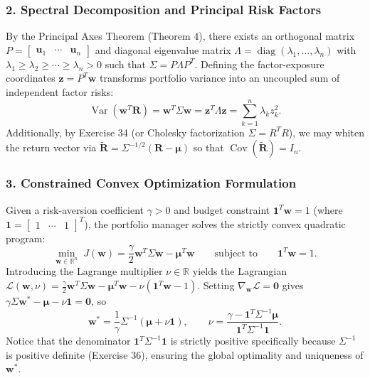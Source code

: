 \documentclass[11pt, letterpaper]{article}
\theoremstyle{definition}
\theoremstyle{remark}
\begin{document}
\subsubsection*{2. Spectral Decomposition and Principal Risk Factors}
By the Principal Axes Theorem (Theorem 4), there exists an orthogonal matrix $P = \begin{bmatrix} \mathbf{u}_1 & \cdots & \mathbf{u}_n \end{bmatrix}$ and diagonal eigenvalue matrix $\Lambda = \operatorname{diag}(\lambda_1, \dots, \lambda_n)$ with $\lambda_1 \ge \lambda_2 \ge \cdots \ge \lambda_n > 0$ such that $\Sigma = P \Lambda P^T$. Defining the factor-exposure coordinates $\mathbf{z} = P^T \mathbf{w}$ transforms portfolio variance into an uncoupled sum of independent factor risks:
\[
\operatorname{Var}(\mathbf{w}^T \mathbf{R}) = \mathbf{w}^T \Sigma \mathbf{w} = \mathbf{z}^T \Lambda \mathbf{z} = \sum_{k=1}^n \lambda_k z_k^2.
\]
Additionally, by Exercise 34 (or Cholesky factorization $\Sigma = R^T R$), we may whiten the return vector via $\widetilde{\mathbf{R}} = \Sigma^{-1/2}(\mathbf{R} - \boldsymbol{\mu})$ so that $\operatorname{Cov}(\widetilde{\mathbf{R}}) = I_n$.

\subsubsection*{3. Constrained Convex Optimization Formulation}
Given a risk-aversion coefficient $\gamma > 0$ and budget constraint $\mathbf{1}^T \mathbf{w} = 1$ (where $\mathbf{1} = \begin{bmatrix} 1 & \cdots & 1 \end{bmatrix}^T$), the portfolio manager solves the strictly convex quadratic program:
\[
\min_{\mathbf{w} \in \mathbb{R}^n} \; J(\mathbf{w}) = \frac{\gamma}{2} \mathbf{w}^T \Sigma \mathbf{w} - \boldsymbol{\mu}^T \mathbf{w} \qquad \text{subject to} \qquad \mathbf{1}^T \mathbf{w} = 1.
\]
Introducing the Lagrange multiplier $\nu \in \mathbb{R}$ yields the Lagrangian $\mathcal{L}(\mathbf{w}, \nu) = \frac{\gamma}{2}\mathbf{w}^T \Sigma \mathbf{w} - \boldsymbol{\mu}^T \mathbf{w} - \nu(\mathbf{1}^T \mathbf{w} - 1)$. Setting $\nabla_{\mathbf{w}} \mathcal{L} = \mathbf{0}$ gives $\gamma \Sigma \mathbf{w}^* - \boldsymbol{\mu} - \nu \mathbf{1} = \mathbf{0}$, so
\[
\mathbf{w}^* = \frac{1}{\gamma}\Sigma^{-1}(\boldsymbol{\mu} + \nu \mathbf{1}), \qquad \nu = \frac{\gamma - \mathbf{1}^T \Sigma^{-1} \boldsymbol{\mu}}{\mathbf{1}^T \Sigma^{-1} \mathbf{1}}.
\]
Notice that the denominator $\mathbf{1}^T \Sigma^{-1} \mathbf{1}$ is strictly positive specifically because $\Sigma^{-1}$ is positive definite (Exercise 36), ensuring the global optimality and uniqueness of $\mathbf{w}^*$.
\end{document}
